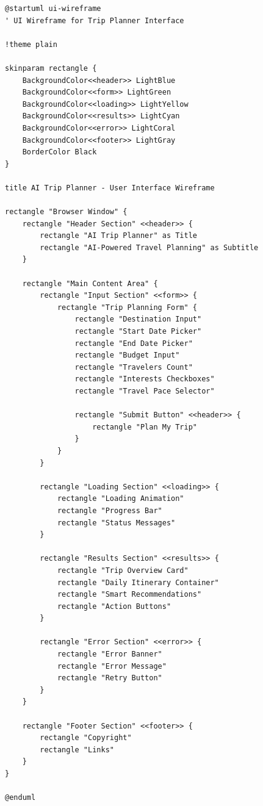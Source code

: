 \documentclass[12pt,a4paper]{report}
\begin{document}
\begin{lstlisting}[style=pythonstyle, caption={UI Wireframe - PlantUML Code}, language={}]
@startuml ui-wireframe
' UI Wireframe for Trip Planner Interface

!theme plain

skinparam rectangle {
    BackgroundColor<<header>> LightBlue
    BackgroundColor<<form>> LightGreen
    BackgroundColor<<loading>> LightYellow
    BackgroundColor<<results>> LightCyan
    BackgroundColor<<error>> LightCoral
    BackgroundColor<<footer>> LightGray
    BorderColor Black
}

title AI Trip Planner - User Interface Wireframe

rectangle "Browser Window" {
    rectangle "Header Section" <<header>> {
        rectangle "AI Trip Planner" as Title
        rectangle "AI-Powered Travel Planning" as Subtitle
    }
    
    rectangle "Main Content Area" {
        rectangle "Input Section" <<form>> {
            rectangle "Trip Planning Form" {
                rectangle "Destination Input"
                rectangle "Start Date Picker"
                rectangle "End Date Picker"
                rectangle "Budget Input"
                rectangle "Travelers Count"
                rectangle "Interests Checkboxes"
                rectangle "Travel Pace Selector"
                
                rectangle "Submit Button" <<header>> {
                    rectangle "Plan My Trip"
                }
            }
        }
        
        rectangle "Loading Section" <<loading>> {
            rectangle "Loading Animation"
            rectangle "Progress Bar"
            rectangle "Status Messages"
        }
        
        rectangle "Results Section" <<results>> {
            rectangle "Trip Overview Card"
            rectangle "Daily Itinerary Container"
            rectangle "Smart Recommendations"
            rectangle "Action Buttons"
        }
        
        rectangle "Error Section" <<error>> {
            rectangle "Error Banner"
            rectangle "Error Message"
            rectangle "Retry Button"
        }
    }
    
    rectangle "Footer Section" <<footer>> {
        rectangle "Copyright"
        rectangle "Links"
    }
}

@enduml
\end{lstlisting}
\end{document}
